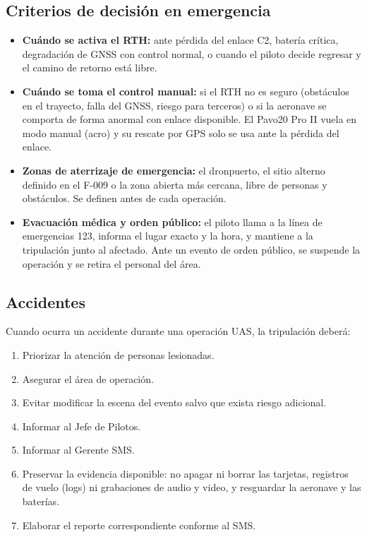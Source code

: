 \subsection{Criterios de decisión en emergencia}

\begin{itemize}
\item \textbf{Cuándo se activa el RTH:} ante pérdida del enlace C2, batería crítica, degradación de GNSS con control normal, o cuando el piloto decide regresar y el camino de retorno está libre.
\item \textbf{Cuándo se toma el control manual:} si el RTH no es seguro (obstáculos en el trayecto, falla del GNSS, riesgo para terceros) o si la aeronave se comporta de forma anormal con enlace disponible. El Pavo20 Pro II vuela en modo manual (acro) y su rescate por GPS solo se usa ante la pérdida del enlace.
\item \textbf{Zonas de aterrizaje de emergencia:} el dronpuerto, el sitio alterno definido en el F-009 o la zona abierta más cercana, libre de personas y obstáculos. Se definen antes de cada operación.
\item \textbf{Evacuación médica y orden público:} el piloto llama a la línea de emergencias 123, informa el lugar exacto y la hora, y mantiene a la tripulación junto al afectado. Ante un evento de orden público, se suspende la operación y se retira el personal del área.
\end{itemize}

\subsection{Accidentes}

Cuando ocurra un accidente durante una operación UAS, la tripulación deberá:

\begin{enumerate}

\item Priorizar la atención de personas lesionadas.

\item Asegurar el área de operación.

\item Evitar modificar la escena del evento salvo que exista riesgo adicional.

\item Informar al Jefe de Pilotos.

\item Informar al Gerente SMS.

\item Preservar la evidencia disponible: no apagar ni borrar las tarjetas, registros de vuelo (logs) ni grabaciones de audio y video, y resguardar la aeronave y las baterías.

\item Elaborar el reporte correspondiente conforme al SMS.

\end{enumerate}


